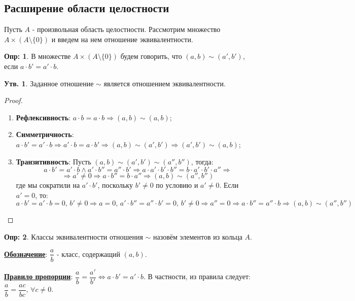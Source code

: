 \documentclass[12pt]{article}
\theoremstyle{definition}
\newtheorem{defn}{Опр:}
\newtheorem{prop}{Утв.}
\begin{document}
\subsection*{Расширение области целостности}
Пусть $A$ - произвольная область целостности. Рассмотрим множество $A \times \left(A\setminus \{0\}\right)$ и введем на нем отношение эквивалентности.
\begin{defn}
	В множестве $A \times \left(A\setminus \{0\}\right)$ будем говорить, что $(a,b) \sim (a',b')$, если $a{\cdot}b' = a'{\cdot}b$.
\end{defn}
\begin{prop}
	Заданное отношение $\sim$ является отношением эквивалентности.
\end{prop}
\begin{proof}\hfill
	\begin{enumerate}[label=\arabic*)]
		\item \textbf{Рефлексивность}: $a{\cdot}b = a{\cdot}b \Rightarrow (a,b) \sim (a,b)$;
		\item \textbf{Симметричность}: $a{\cdot}b' = a'{\cdot}b \Rightarrow a'{\cdot}b = a{\cdot}b' \Rightarrow (a,b)\sim (a',b') \Rightarrow (a',b') \sim (a,b)$;
		\item \textbf{Транзитивность}: Пусть $(a,b) \sim (a',b') \sim (a'', b'')$, тогда:
		$$
			a{\cdot}b' = a'{\cdot}b \wedge a'{\cdot}b'' = a''{\cdot}b' \Rightarrow a{\cdot}a'{\cdot}b'{\cdot}b'' = b{\cdot}a'{\cdot}b'{\cdot}a'' \Rightarrow
		$$
		$$
			\Rightarrow a' \neq 0 \Rightarrow a{\cdot}b'' = b{\cdot}a'' \Rightarrow (a,b) \sim (a'',b'')
		$$
		где мы сократили на $a'{\cdot}b'$, поскольку $b' \neq 0$ по условию и $a' \neq 0$. Если $a' = 0$, то:
		$$
			a{\cdot}b' = a'{\cdot}b = 0, \, b' \neq 0 \Rightarrow a= 0, \, a'{\cdot}b'' = a''{\cdot}b' = 0, \, b' \neq 0 \Rightarrow a'' = 0 \Rightarrow a{\cdot}b'' = a''{\cdot}b \Rightarrow (a,b) \sim (a'',b'')
		$$
	\end{enumerate}
\end{proof}

\begin{defn}
	Классы эквивалентности отношения $\sim$ назовём  элементов из кольца $A$.
\end{defn}

\textbf{\uline{Обозначение}}: $\dfrac{a}{b}$ - класс, содержащий $(a,b)$.

\textbf{\uline{Правило пропорции}}: $\dfrac{a}{b} = \dfrac{a'}{b'} \Leftrightarrow a{\cdot}b' = a'{\cdot}b$. В частности, из правила следует: $\dfrac{a}{b} = \dfrac{ac}{bc}, \, \forall c \neq 0$.
\end{document}
